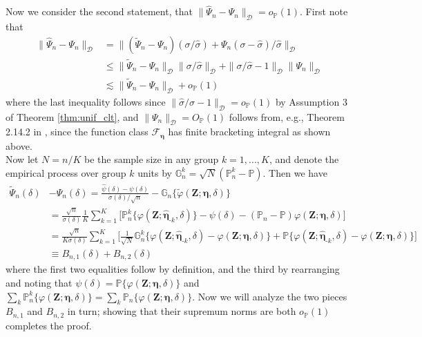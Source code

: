 \documentclass[12pt]{article}
\newcommand{\Pb}{\mathbb{P}}
\newcommand{\Pn}{\mathbb{P}_n}
\newcommand{\Gn}{\mathbb{G}_n}
\newcommand{\bZ}{\mathbf{Z}}
\theoremstyle{remark}
\begin{document}
Now we consider the second statement, that $\| \widehat\Psi_n - \Psi_n \|_\mathcal{D} =o_\Pb(1)$.  First note that
\begin{align*}
\| \widehat\Psi_n - \Psi_n \|_\mathcal{D} &= \| (\widetilde\Psi_n - \Psi_n) (\sigma/\hat\sigma) + \Psi_n (\sigma-\hat\sigma) / \hat\sigma \|_\mathcal{D} \\
&\leq \| \widetilde\Psi_n - \Psi_n \|_\mathcal{D} \| \sigma/\hat\sigma \|_\mathcal{D} + \| \sigma/\hat\sigma - 1\|_\mathcal{D} \|\Psi_n \|_\mathcal{D} \\
& \lesssim \| \widetilde\Psi_n - \Psi_n \|_\mathcal{D}  + o_\Pb(1)
\end{align*}
where the last inequality follows since $\|\hat\sigma/\sigma - 1\|_\mathcal{D}=o_\Pb(1)$ by Assumption 3 of Theorem \ref{thm:unif_clt}, and $\|\Psi_n \|_\mathcal{D}=O_\Pb(1)$ follows from, e.g., Theorem 2.14.2 in \textcite{van1996weak}, since the function class $\mathcal{F}_{\boldsymbol\eta}$ has finite bracketing integral as shown above. \\

Now let $N=n/K$ be the sample size in any group $k=1,...,K$, and denote the empirical process over group $k$ units by $\Gn^k=\sqrt{N}(\Pn^k - \Pb)$. Then we have 
\begin{align*}
\widetilde\Psi_n(\delta) &- \Psi_n(\delta) = \frac{ \hat\psi(\delta) - \psi(\delta) }{\sigma(\delta) / \sqrt{n} } -  \Gn \{ \widetilde\varphi(\bZ;\boldsymbol\eta, \delta) \} \\
&= \frac{\sqrt{n}}{\sigma(\delta)} \frac{1}{K} \sum_{k=1}^K \Big[ \Pn^k\{ \varphi(\bZ;\hat{\boldsymbol\eta}_{\text{-}k},\delta)\} - \psi(\delta) - (\Pn-\Pb)\varphi(\bZ;\boldsymbol\eta,\delta) \Big] \\
&= \frac{\sqrt{n}}{K \sigma(\delta)} \sum_{k=1}^K \Big[ \frac{1}{\sqrt{N}} \Gn^k \Big\{ \varphi(\bZ; \hat{\boldsymbol\eta}_{\text{-}k},\delta) -\varphi(\bZ;\boldsymbol\eta, \delta) \Big\} + \Pb\Big\{ \varphi(\bZ; \hat{\boldsymbol\eta}_{\text{-}k},\delta) -  \varphi(\bZ;\boldsymbol\eta,\delta) \Big\} \Big] \\
&\equiv B_{n,1}(\delta) + B_{n,2}(\delta)
 \end{align*}
where the first two equalities follow by definition, and the third by rearranging and noting that 
$ \psi(\delta) = \Pb\{\varphi(\bZ;\boldsymbol\eta,\delta)\} $
and 
$ \sum_k \Pn^k\{\varphi(\bZ;\boldsymbol\eta,\delta)\} = \sum_k \Pn\{\varphi(\bZ;\boldsymbol\eta,\delta)\} $. Now we will analyze the two pieces $B_{n,1}$ and $B_{n,2}$ in turn; showing that their supremum norms are both $o_\Pb(1)$ completes the proof. \\
\end{document}
